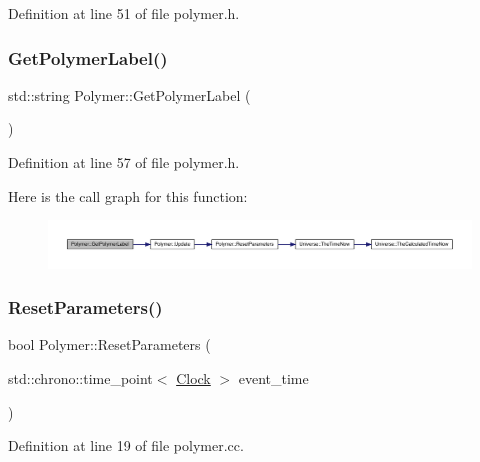 Definition at line 51 of file polymer.\+h.

\mbox{\label{class_polymer_a80dbc65ac07e20dce3d9a2e9290c5e3b}} 
\subsubsection{\texorpdfstring{Get\+Polymer\+Label()}{GetPolymerLabel()}}
{\footnotesize\ttfamily std\+::string Polymer\+::\+Get\+Polymer\+Label (\begin{DoxyParamCaption}{ }\end{DoxyParamCaption})\hspace{0.3cm}{\ttfamily [inline]}}



Definition at line 57 of file polymer.\+h.

Here is the call graph for this function\+:
\nopagebreak
\begin{figure}[H]
\begin{center}
\leavevmode
\includegraphics[width=350pt]{class_polymer_a80dbc65ac07e20dce3d9a2e9290c5e3b_cgraph}
\end{center}
\end{figure}
\mbox{\label{class_polymer_aa20f1e5c79e8631afa291569d5030103}} 
\subsubsection{\texorpdfstring{Reset\+Parameters()}{ResetParameters()}}
{\footnotesize\ttfamily bool Polymer\+::\+Reset\+Parameters (\begin{DoxyParamCaption}\item[{std\+::chrono\+::time\+\_\+point$<$ \hyperlink{universe_8h_a0ef8d951d1ca5ab3cfaf7ab4c7a6fd80}{Clock} $>$}]{event\+\_\+time }\end{DoxyParamCaption})}



Definition at line 19 of file polymer.\+cc.

